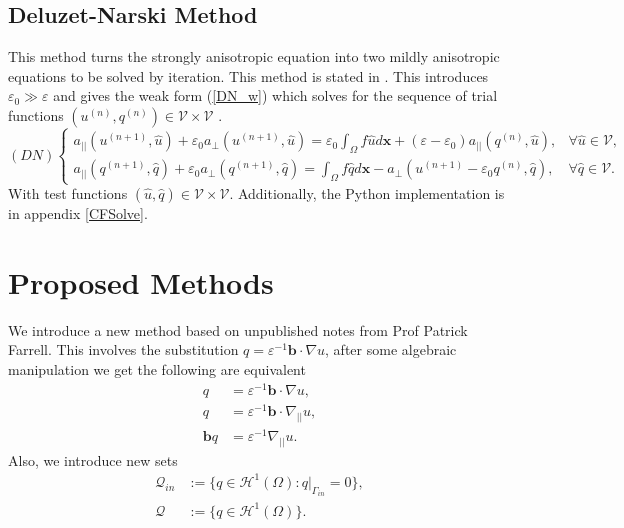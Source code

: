 \documentclass[12pt]{ociamthesis}
\begin{document}
\subsection{Deluzet-Narski Method} \label{DN}
This method turns the strongly anisotropic equation into two mildly anisotropic equations to be solved by iteration. This method is stated in \cite{DN}. This introduces $\varepsilon_0 \gg \varepsilon$ and gives the weak form (\ref{DN_w}) which solves for the sequence of trial functions $(u^{(n)}, q^{(n)}) \in \mathcal{V} \times \mathcal{V}$ .
 \begin{equation} \label{DN_w}
 (DN)
   \begin{cases}
  a_{||}(u^{(n+1)}, \hat{u}) + \varepsilon_0 a_{\perp}(u^{(n+1)}, \hat{u}) = 
  \varepsilon_0 \int_{\Omega} f \hat{u} d\mathbf{x}
  +(\varepsilon-\varepsilon_0)a_{||}(q^{(n)}, \hat{u}),
  & \forall \hat{u} \in \mathcal{V},\\
  a_{||}(q^{(n+1)}, \hat{q}) + \varepsilon_0 a_{\perp}(q^{(n+1)}, \hat{q}) = 
  \int_{\Omega} f \hat{q} d\mathbf{x}
  -a_{\perp}(u^{(n+1)} - \varepsilon_0 q^{(n)}, \hat{q}),
  & \forall \hat{q} \in \mathcal{V}.
  \end{cases}
  \end{equation}
With test functions $(\hat{u}, \hat{q}) \in \mathcal{V} \times \mathcal{V}$. Additionally, the Python implementation is in appendix \ref{CFSolve}.

\section{Proposed Methods}
We introduce a new method based on unpublished notes from Prof Patrick Farrell. This involves the substitution $q=\varepsilon^{-1} \mathbf{b} \cdot \nabla u$, after some algebraic manipulation we get the following are equivalent
\begin{align}
q &= \varepsilon^{-1} \mathbf{b}\cdot \nabla u,\\
q &= \varepsilon^{-1} \mathbf{b} \cdot \nabla_{||} u, \\
\mathbf{b}q &= \varepsilon^{-1} \nabla_{||} u.
\end{align}
Also, we introduce new sets 
\begin{align}
\mathcal{Q}_{in} &:= \{ q \in \mathcal{H}^1(\Omega) : q|_{\Gamma_{in}}=0\}, \\
\mathcal{Q} &:= \{ q \in \mathcal{H}^1(\Omega)\}.
\end{align}
\end{document}
